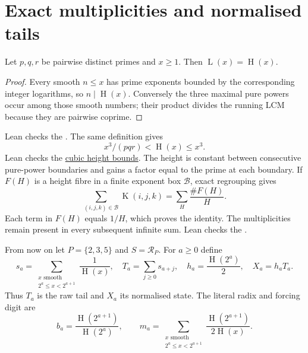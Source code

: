 \documentclass[11pt]{article}
\newcommand{\hgt}{\operatorname{H}}
\newcommand{\Lprefix}{\operatorname{L}}
\newcommand{\Kernel}{\operatorname{K}}
\begin{document}
\section{Exact multiplicities and normalised tails}
\label{sec:lcm}\label{sec:cells}\label{sec:fibre}\label{sec:shell}
\label{sec:actual-orbit}

\begin{proposition}\label{res:lcm}
Let $p,q,r$ be pairwise distinct primes and $x\ge1$.  Then
$\Lprefix(x)=\hgt(x)$.
\end{proposition}
\begin{proof}
Every smooth $n\le x$ has prime exponents bounded by the corresponding
integer logarithms, so $n\mid\hgt(x)$.  Conversely the three maximal pure
powers occur among those smooth numbers; their product divides the running
LCM because they are pairwise coprime.
\end{proof}

\noindent Lean checks the .
The same definition gives
\begin{equation}\label{res:cube}
 x^3/(pqr)<\hgt(x)\le x^3.
\end{equation}
Lean checks the \href{https://github.com/wcook04/plectis-erdos/blob/f36a98bf3d3e6f65f1074e3b800e3293d5b8a51a/ErdosProblems/Erdos269/PaperR7BasicAssembly.lean#L112}{cubic height bounds}.
The height is constant between consecutive pure-power boundaries and gains
a factor equal to the prime at each boundary.  If $F(H)$ is a height fibre
in a finite exponent box $\mathcal B$, exact regrouping gives
\begin{equation}\label{res:fibre}
 \sum_{(i,j,k)\in\mathcal B}\Kernel(i,j,k)=\sum_H\frac{\#F(H)}H.
\end{equation}
Each term in $F(H)$ equals $1/H$, which proves the identity.  The
multiplicities remain present in every subsequent infinite sum.
Lean checks the .

From now on let $P=\{2,3,5\}$ and $S=\mathcal R_P$.  For $a\ge0$ define
\[
 s_a=\sum_{\substack{x\text{ smooth}\\2^a\le x<2^{a+1}}}\frac1{\hgt(x)},
 \quad T_a=\sum_{j\ge0}s_{a+j},\quad
 h_a=\frac{\hgt(2^a)}2,\quad X_a=h_aT_a.
\]
Thus $T_a$ is the raw tail and $X_a$ its normalised state.
The literal radix and forcing digit are
\begin{equation}\label{eq:actual-digit}
 b_a=\frac{\hgt(2^{a+1})}{\hgt(2^a)},\qquad
 m_a=\sum_{\substack{x\text{ smooth}\\2^a\le x<2^{a+1}}}
       \frac{\hgt(2^{a+1})}{2\hgt(x)}.
\end{equation}
\end{document}
